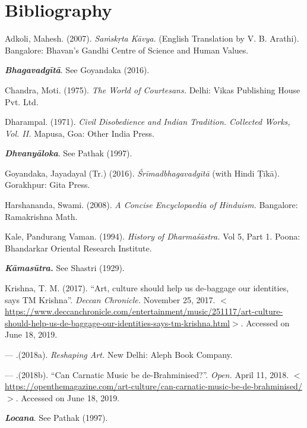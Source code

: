 \section*{Bibliography}

\begin{thebibliography}{99}
\itemsep=0pt

  Adkoli, Mahesh. (2007). \textit{Saṁskṛta Kāvya.} (English Translation by V. B. Arathi). Bangalore: Bhavan’s Gandhi Centre of Science and Human Values.

  \textit{\textbf{Bhagavadgītā}}. See Goyandaka (2016).

  Chandra, Moti. (1975). \textit{The World of Courtesans.} Delhi: Vikas Publishing House Pvt. Ltd.

  Dharampal. (1971). \textit{Civil Disobedience and Indian Tradition. Collected Works, Vol. II.} Mapusa, Goa: Other India Press.

  \textit{\textbf{Dhvanyāloka}}. See Pathak (1997).

  Goyandaka, Jayadayal (Tr.) (2016). \textit{Śrīmadbhagavadgītā} (with Hindi Ṭīkā). Gorakhpur: Gita Press.

  Harshananda, Swami. (2008). \textit{A Concise Encyclopaedia of Hinduism.} Bangalore: Ramakrishna Math.

  Kale, Pandurang Vaman. (1994). \textit{History of Dharmaśāstra.} Vol 5, Part 1. Poona: Bhandarkar Oriental Research Institute.

  \textit{\textbf{Kāmasūtra.}} See Shastri (1929).

  Krishna, T. M. (2017). “Art, culture should help us de-baggage our identities, says TM Krishna”. \textit{Deccan Chronicle.} November 25, 2017. $<$\url{https://www.deccanchronicle.com/entertainment/music/251117/art-culture-should-help-us-de-baggage-our-identities-says-tm-krishna.html}$>$. Accessed on June 18, 2019.

  — .(2018a). \textit{Reshaping Art.} New Delhi: Aleph Book Company.

  — .(2018b). “Can Carnatic Music be de-Brahminised?”. \textit{Open.} April 11, 2018. $<$\url{https://openthemagazine.com/art-culture/can-carnatic-music-be-de-brahminised/}$>$. Accessed on June 18, 2019.

  \textit{\textbf{Locana}}. See Pathak (1997).


\end{thebibliography}
